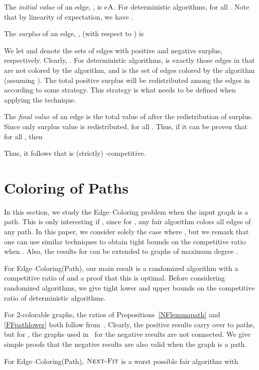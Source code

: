 \documentclass[smallextended]{svjour3}
\def\mck{{\sc Edge--Coloring}\xspace}
\def\mcpath{{\sc Edge--Coloring(Path)}\xspace}
\def\paths{\text{\sc Path}\xspace}
\newcommand{\NF}{\ensuremath{\operatorname{\textsc{Next-Fit}}}\xspace}
\newcommand{\ALG}{\ensuremath{\operatorname{\textsc{A}}}\xspace}
\begin{document}
The \emph{initial value}  of an edge, , is
 e\ALG. 
For deterministic algorithms,  for all .
Note that by
 linearity of expectation, we have . 

The \emph{surplus}  of an edge, , (with respect to ) is 

We let  and  denote the sets of
 edges with positive and negative surplus, respectively.
Clearly, .
For deterministic algorithms,  is exactly those edges in
  that are not colored by the algorithm, and
  is the set of edges colored by the algorithm (assuming
 ).
The total positive surplus  will be redistributed among
 the edges in  according to some strategy. This strategy is
 what needs to be defined when applying the technique. 

The \emph{final value}  of an edge  is the
 total value of  after the redistribution of surplus. 
Since only surplus value is redistributed,  for all . 
Thus, if it can be proven that  for all , then

Thus, it follows that  is (strictly) -competitive.


\section{Coloring of Paths} 
In this section, we study the \mck problem when the input graph is a
path. 
This is only interesting if , since for , any fair algorithm 
colors all edges of any path. In this paper, we consider solely the case where , but we remark that one can use similar techniques to obtain tight bounds on the competitive ratio when . Also, the results for \paths can be extended to graphs of maximum degree .

For \mcpath, our main result is a randomized algorithm with a competitive ratio of  and a proof that this is optimal. Before considering randomized algorithms, we give tight lower and upper bounds on the competitive ratio of deterministic algorithms.

For 2-colorable graphs, the ratios of
 Propositions~\ref{NFlemmapath} and \ref{FFpathlower} both follow
 from~\cite{kedge}.
Clearly, the positive results carry over to paths, but for , the
 graphs used in~\cite{kedge} for the negative results are not connected.
We give simple proofs that the negative results are
 also valid when the graph is a path. 

\begin{proposition} 
\label{NFlemmapath}
For \mcpath, \NF is a worst possible fair algorithm with

\end{proposition}
\end{document}
